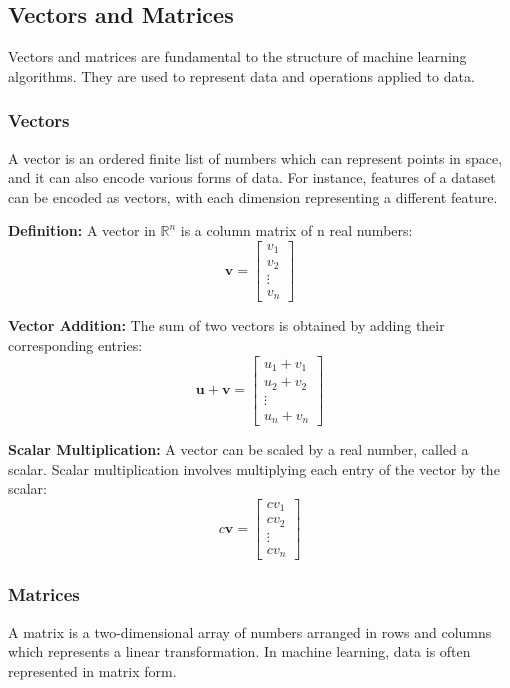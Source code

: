 \documentclass{article}
\begin{document}
	\subsection{Vectors and Matrices}
	Vectors and matrices are fundamental to the structure of machine learning algorithms. They are used to represent data and operations applied to data.
	
	\subsubsection{Vectors}
	A vector is an ordered finite list of numbers which can represent points in space, and it can also encode various forms of data. For instance, features of a dataset can be encoded as vectors, with each dimension representing a different feature.
	
	\textbf{Definition:}
	A vector in $\mathbb{R}^n$ is a column matrix of n real numbers:
	\[
	\mathbf{v} = \begin{bmatrix}
		v_1 \\
		v_2 \\
		\vdots \\
		v_n
	\end{bmatrix}
	\]
	
	\textbf{Vector Addition:}
	The sum of two vectors is obtained by adding their corresponding entries:
	\[
	\mathbf{u} + \mathbf{v} = \begin{bmatrix}
		u_1 + v_1 \\
		u_2 + v_2 \\
		\vdots \\
		u_n + v_n
	\end{bmatrix}
	\]
	
	\textbf{Scalar Multiplication:}
	A vector can be scaled by a real number, called a scalar. Scalar multiplication involves multiplying each entry of the vector by the scalar:
	\[
	c\mathbf{v} = \begin{bmatrix}
		cv_1 \\
		cv_2 \\
		\vdots \\
		cv_n
	\end{bmatrix}
	\]
	
	\subsubsection{Matrices}
	A matrix is a two-dimensional array of numbers arranged in rows and columns which represents a linear transformation. In machine learning, data is often represented in matrix form.
	
\end{document}
